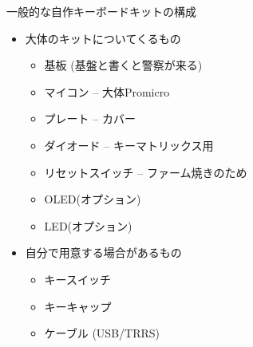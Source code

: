 \documentclass[cjk,dvipdfmx,10pt,compress,fragile%
hyperref={bookmarks=true,bookmarksnumbered=true,bookmarksopen=false,%
colorlinks=false,%
pdftitle={第 134 回 関西 Debian 勉強会},%
pdfauthor={小林},%
pdfsubject={資料},%
}]{beamer}
\begin{document}
\begin{frame}[fragile,t]{一般的な自作キーボードキットの構成}
 \begin{itemize}
  \item 大体のキットについてくるもの
	\begin{itemize}
	 \item 基板 (基盤と書くと警察が来る)
	 \item マイコン -- 大体Promicro
	 \item プレート -- カバー
	 \item ダイオード -- キーマトリックス用
	 \item リセットスイッチ -- ファーム焼きのため
	 \item OLED(オプション)
	 \item LED(オプション)
	\end{itemize}
  \item 自分で用意する場合があるもの
	\begin{itemize}
	 \item キースイッチ
	 \item キーキャップ
	 \item ケーブル (USB/TRRS)
	\end{itemize}
 \end{itemize}
\end{frame}
\end{document}
